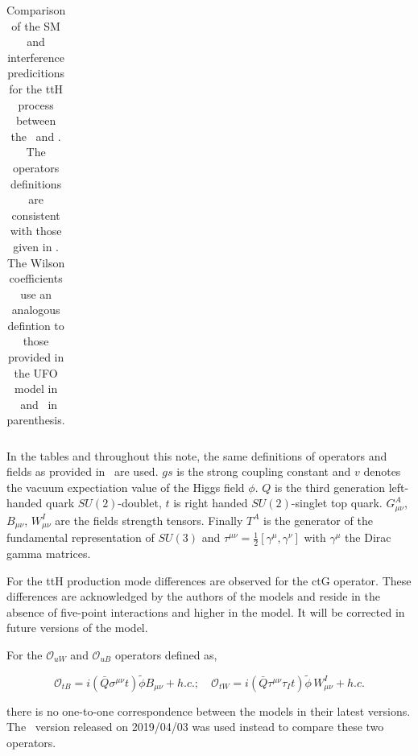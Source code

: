 \begin{table}[h!]
{\begin{tabular}{|l|l|c|c|}
      \hline
    \end{tabular}
  }
  \caption{ Comparison of the SM and interference predicitions for the ttH process between the \SMEFTsim\ and \SMEFTatNLO. The operators definitions are consistent with those given in \SMEFTatNLO. The Wilson coefficients use an analogous defintion to those provided  in the UFO model in \SMEFTatNLO\ and \SMEFTsim\ in parenthesis.}
  \label{tab:higgseft:tthcompa}
\end{table}


In the tables and throughout this note, the same definitions of operators and fields as provided in~\cite{SMEFTNLOdefs} are used. $gs$ is the strong coupling constant and $v$ denotes the vacuum expectiation value of the Higgs field $\phi$. $Q$ is the third generation left-handed quark $SU(2)$-doublet, $t$ is right handed $SU(2)$-singlet top quark. $G_{\mu\nu}^{A}$, $B_{\mu\nu}$, $W^{I}_{\mu\nu}$ are the fields strength tensors. Finally $T^{A}$ is the generator of the fundamental representation of $SU(3)$ and $\tau^{\mu\nu}=\frac{1}{2}[\gamma^{\mu},\gamma^{\nu}]$  with $\gamma^{\mu}$ the Dirac gamma matrices.



For the ttH production mode differences are observed for the ctG operator. These differences are acknowledged by the authors of the models and reside in the absence of five-point interactions and higher in the \SMEFTsim model. It will be corrected in future versions of the model.

For the $\mathcal{O}_{uW}$ and $\mathcal{O}_{uB}$ operators defined as,

$$ \mathcal{O}_{tB} = i(\bar Q \sigma^{\mu\nu} t) \tilde \phi  B_{\mu\nu} + h.c.; \quad
   \mathcal{O}_{tW} =  i(\bar{Q} \tau^{\mu\nu}\tau_{I} t)  \tilde{\phi} \, W_{\mu\nu}^I + h. c.
$$

   there is no one-to-one correspondence between the models in their latest versions. The \SMEFTatNLO\ version released on 2019/04/03 was used instead to compare these two operators.


